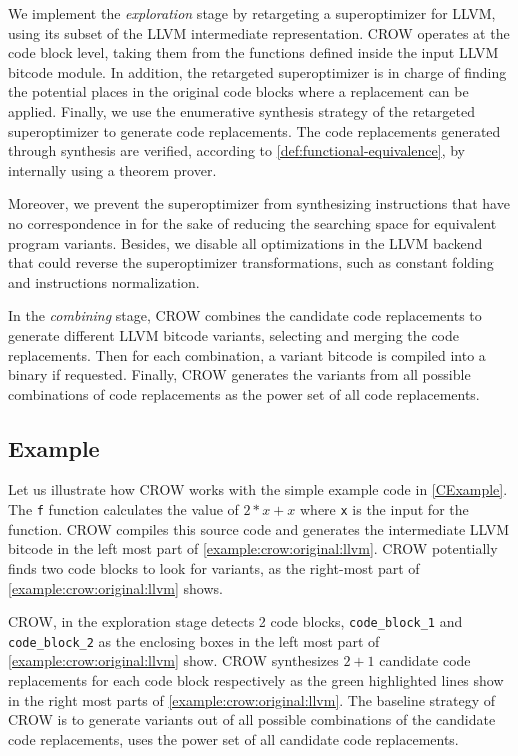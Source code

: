 We implement the \emph{exploration} stage by retargeting a superoptimizer for  LLVM, using its subset of the LLVM intermediate representation. CROW operates at the code block level, taking them from the functions defined inside the input LLVM bitcode module. In addition, the retargeted superoptimizer is in charge of finding the potential places in the original code blocks where a replacement can be applied. Finally, we use the enumerative synthesis strategy of the retargeted superoptimizer to generate code replacements.
The code replacements generated through synthesis are verified, according to \autoref{def:functional-equivalence}, by internally using a theorem prover. 

Moreover, we prevent the superoptimizer from synthesizing instructions that have no correspondence in \wasm for the sake of reducing the searching space for equivalent program variants. Besides, we disable all optimizations in the \wasm LLVM backend that could reverse the superoptimizer transformations, such as constant folding and instructions normalization.


In the \emph{combining} stage, CROW combines the candidate code replacements to generate different LLVM bitcode variants, selecting and merging the code replacements. 
Then for each combination, a variant bitcode is compiled into a \wasm binary if requested. Finally, CROW generates the variants from all possible combinations of code replacements as the power set of all code replacements.  

\subsection{Example}
\label{section:crow:example}
 Let us illustrate how CROW works with the simple example code in \autoref{CExample}. The \texttt{f} function calculates the value of $2 * x + x$ where \texttt{x} is the input for the function.  CROW compiles this source code and generates the intermediate LLVM bitcode in the left most part of \autoref{example:crow:original:llvm}. CROW potentially finds two code blocks to look for variants, as the right-most part of \autoref{example:crow:original:llvm} shows.


    

CROW, in the exploration stage detects 2 code blocks, \texttt{code\_block\_1} and \texttt{code\_block\_2} as the enclosing boxes in the left most part of \autoref{example:crow:original:llvm} show. CROW synthesizes $2 + 1$ candidate code replacements for each code block respectively as the green highlighted lines show in the right most parts of \autoref{example:crow:original:llvm}.
The baseline strategy of CROW is to generate variants out of all possible combinations of the candidate code replacements, \ie uses the power set of all candidate code replacements.


